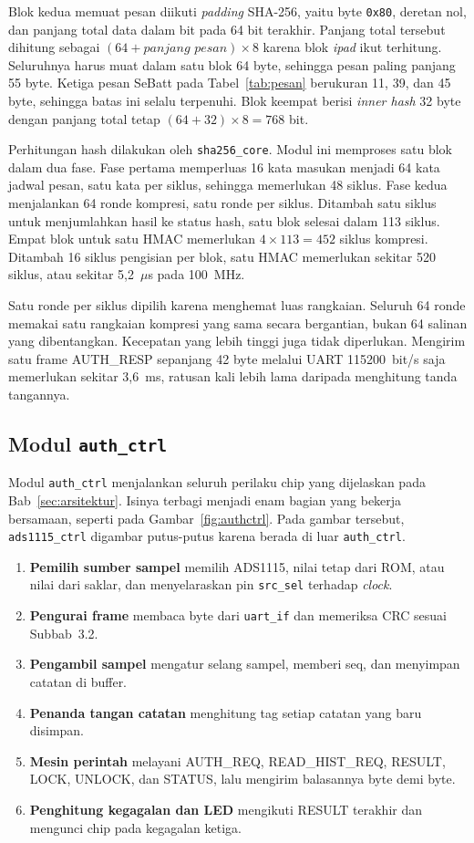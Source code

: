 \documentclass[11pt,a4paper]{article}
\begin{document}
Blok kedua memuat pesan diikuti \textit{padding} SHA-256, yaitu byte \texttt{0x80}, deretan nol,
dan panjang total data dalam bit pada 64 bit terakhir. Panjang total tersebut dihitung sebagai
$(64 + \textit{panjang pesan}) \times 8$ karena blok \textit{ipad} ikut terhitung. Seluruhnya harus
muat dalam satu blok 64 byte, sehingga pesan paling panjang 55 byte. Ketiga pesan SeBatt pada
Tabel~\ref{tab:pesan} berukuran 11, 39, dan 45 byte, sehingga batas ini selalu terpenuhi. Blok
keempat berisi \textit{inner hash} 32 byte dengan panjang total tetap $(64 + 32) \times 8 = 768$
bit.

Perhitungan hash dilakukan oleh \texttt{sha256\_core}. Modul ini memproses satu blok dalam dua
fase. Fase pertama memperluas 16 kata masukan menjadi 64 kata jadwal pesan, satu kata per siklus,
sehingga memerlukan 48 siklus. Fase kedua menjalankan 64 ronde kompresi, satu ronde per siklus.
Ditambah satu siklus untuk menjumlahkan hasil ke status hash, satu blok selesai dalam 113 siklus.
Empat blok untuk satu HMAC memerlukan $4 \times 113 = 452$ siklus kompresi. Ditambah 16 siklus pengisian per
blok, satu HMAC memerlukan sekitar 520 siklus, atau sekitar 5,2~$\mu$s pada 100~MHz.

Satu ronde per siklus dipilih karena menghemat luas rangkaian. Seluruh 64 ronde memakai satu
rangkaian kompresi yang sama secara bergantian, bukan 64 salinan yang dibentangkan. Kecepatan yang
lebih tinggi juga tidak diperlukan. Mengirim satu frame AUTH\_RESP sepanjang 42 byte melalui UART
115200~bit/s saja memerlukan sekitar 3,6~ms, ratusan kali lebih lama daripada menghitung tanda
tangannya.

\subsection{Modul \texttt{auth\_ctrl}}
\label{subsec:authctrl}

Modul \texttt{auth\_ctrl} menjalankan seluruh perilaku chip yang dijelaskan pada
Bab~\ref{sec:arsitektur}. Isinya terbagi menjadi enam bagian yang bekerja bersamaan, seperti pada
Gambar~\ref{fig:authctrl}. Pada gambar tersebut, \texttt{ads1115\_ctrl} digambar putus-putus
karena berada di luar \texttt{auth\_ctrl}.
\begin{enumerate}
  \item \textbf{Pemilih sumber sampel} memilih ADS1115, nilai tetap dari ROM, atau nilai dari
    saklar, dan menyelaraskan pin \texttt{src\_sel} terhadap \textit{clock}.
  \item \textbf{Pengurai frame} membaca byte dari \texttt{uart\_if} dan memeriksa CRC sesuai
    Subbab~3.2.
  \item \textbf{Pengambil sampel} mengatur selang sampel, memberi seq, dan menyimpan catatan di
    buffer.
  \item \textbf{Penanda tangan catatan} menghitung tag setiap catatan yang baru disimpan.
  \item \textbf{Mesin perintah} melayani AUTH\_REQ, READ\_HIST\_REQ, RESULT, LOCK, UNLOCK, dan
    STATUS, lalu mengirim balasannya byte demi byte.
  \item \textbf{Penghitung kegagalan dan LED} mengikuti RESULT terakhir dan mengunci chip pada
    kegagalan ketiga.
\end{enumerate}
\end{document}
